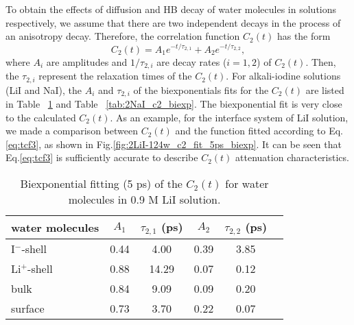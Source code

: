 To obtain the effects of diffusion and HB decay of water molecules
in solutions respectively, we assume that there are two independent 
decays in the process of an anisotropy decay. 
Therefore, the correlation function $C_2(t)$ has the form \cite{TanHS05}
\begin{equation}
C_2(t)=A_1e^{-t/\tau_{2,1}} +A_2e^{-t/\tau_{2,2}},
\label{eq:tcf3}
\end{equation}
where $A_i$ are amplitudes and $1/\tau_{2,i}$ are decay rates ($i=1, 2$) of $C_2(t)$. 
Then, the $\tau_{2,i}$ represent the relaxation times of the $C_2(t)$. 
For alkali-iodine solutions (LiI and NaI), the $A_i$ and $\tau_{2,i}$ of the biexponentials fits for 
the $C_2(t)$ are listed in Table ~\ref{tab:2LiI_c2_biexp} and Table ~\ref{tab:2NaI_c2_biexp}.
The biexponential fit is very close to the calculated $C_2(t)$. 
As an example, for the interface system of LiI solution, we made a comparison between $C_2(t)$ 
and the function fitted according to Eq.\thinspace\ref{eq:tcf3},
as shown in Fig.\thinspace\ref{fig:2LiI-124w_c2_fit_5ps_biexp}. 
It can be seen that Eq.\thinspace\ref{eq:tcf3} is sufficiently accurate to describe $C_2(t)$ attenuation characteristics.                        
\begin{table}[H]%
\centering
\caption{\label{tab:2LiI_c2_biexp}%
	Biexponential fitting (5 ps) of the $C_2(t)$ for water molecules in 0.9 M LiI solution.}
\begin{tabular}{lccccc}
water molecules & $A_1$  & $\tau_{2,1}$ (ps) & $A_2$ & $\tau_{2,2}$ (ps) \\
\hline
I$^-$-shell & 0.44 & 4.00 & 0.39 & 3.85\\
Li$^+$-shell & 0.88 & 14.29 & 0.07 & 0.12\\
bulk & 0.84 & 9.09 & 0.09 & 0.20 \\
surface & 0.73 & 3.70 & 0.22 & 0.07 \\
\end{tabular}
\end{table}

